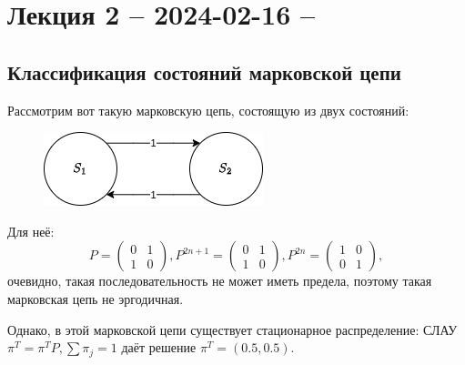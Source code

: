 \section{Лекция 2 -- 2024-02-16 -- }

\subsection{Классификация состояний марковской цепи}

\begin{ex}
  Рассмотрим вот такую марковскую цепь, состоящую из двух состояний:
  \begin{figure}[h!]
    \centering
    \includegraphics[width=0.2\linewidth]{Figures/lec2-ex1}
  \end{figure}
 
  Для неё:
  \[
    P = \begin{pmatrix}
      0 & 1 \\
      1 & 0
    \end{pmatrix},
    P^{2n + 1} = \begin{pmatrix}
      0 & 1 \\
      1 & 0
    \end{pmatrix},
    P^{2n} = \begin{pmatrix}
      1 & 0 \\
      0 & 1
    \end{pmatrix},
  \]
  очевидно, такая последовательность не может иметь предела, поэтому такая марковская цепь не
  эргодичная.

  Однако, в этой марковской цепи существует стационарное распределение: СЛАУ
  $\pi^T = \pi^T P, \sum \pi_j = 1$ даёт решение $\pi^T = (0.5, 0.5)$.
\end{ex}

